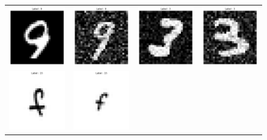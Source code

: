 \documentclass[journal]{IEEEtai}
\begin{document}
\begin{figure}[h]
	\centering
	\begin{tabular}{@{}cccc@{}}
		\includegraphics[width=.21\columnwidth]{Figures/mnist/IMGS/client:1label:9} &
		\includegraphics[width=.21\columnwidth]{Figures/mnist/IMGS/client:27label:9} &
		\includegraphics[width=.21\columnwidth]{Figures/mnist/IMGS/client:17label:3} &
		\includegraphics[width=.21\columnwidth]{Figures/mnist/IMGS/client:23label:3} \\
		\includegraphics[width=.21\columnwidth]{Figures/femnist/IMGS/client:26label:15} &
		\includegraphics[width=.21\columnwidth]{Figures/femnist/IMGS/client:27label:15} &

\end{tabular}
\end{figure}
\end{document}
